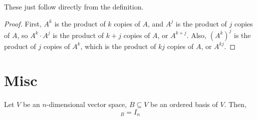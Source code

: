 \documentclass[letterpaper,12pt]{article}
\begin{document}
These just follow directly from the definition.

\begin{proof}
First, $A^k$ is the product of $k$ copies of $A$, and $A^j$ is the product of $j$ copies of $A$, so $A^k \cdot A^j$ is the product of $k + j$ copies of $A$, or $A^{k+j}$. Also, $(A^k)^j$ is the product of $j$ copies of $A^k$, which is the product of $kj$ copies of $A$, or $A^{kj}$.
\end{proof}














\section*{Misc}
\begin{theorem}
Let $V$ be an $n$-dimensional vector space, $B \subseteq V$ be an ordered basis of $V$. Then,
\begin{equation*}
    [\operatorname{Id}_{V}]_{B} = I_n
\end{equation*}
\end{theorem}
\end{document}
